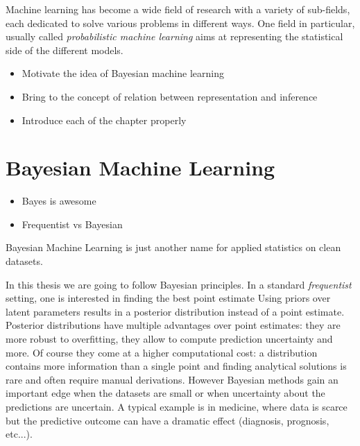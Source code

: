 
\ifpdf
    \graphicspath{{1_introduction/figures/PNG/}{1_introduction/figures/PDF/}{1_introduction/figures/}}
\else
    \graphicspath{{1_introduction/figures/EPS/}{1_introduction/figures/}}
\fi


Machine learning has become a wide field of research with a variety of sub-fields, each dedicated to solve various problems in different ways.
One field in particular, usually called \textit{probabilistic machine learning} aims at representing the statistical side of the different models.

\begin{itemize}
\item Motivate the idea of Bayesian machine learning
\item Bring to the concept of relation between representation and inference
\item Introduce each of the chapter properly
\end{itemize}


\section{Bayesian Machine Learning}

\begin{itemize}
\item Bayes is awesome
\item Frequentist vs Bayesian
\end{itemize}

Bayesian Machine Learning is just another name for applied statistics on clean datasets.


In this thesis we are going to follow Bayesian principles.
In a standard \textit{frequentist} setting, one is interested in finding the best point estimate 
Using priors over latent parameters results in a posterior distribution instead of a point estimate.
Posterior distributions have multiple advantages over point estimates: they are more robust to overfitting, they allow to compute prediction uncertainty and more.
Of course they come at a higher computational cost: a distribution contains more information than a single point and finding analytical solutions is rare and often require manual derivations.
However Bayesian methods gain an important edge when the datasets are small or when uncertainty about the predictions are uncertain.
A typical example is in medicine, where data is scarce but the predictive outcome can have a dramatic effect (diagnosis, prognosis, etc...).



